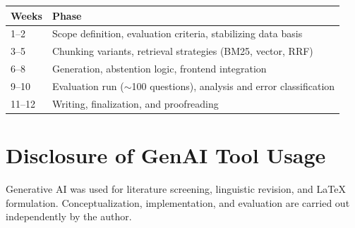 \documentclass[10pt,twocolumn]{article}
\begin{document}
\begin{table}[ht]
\centering
\small
\begin{tabular}{@{}l p{}@{}}
\toprule
\textbf{Weeks} & \textbf{Phase} \\
\midrule
1--2   & Scope definition, evaluation criteria, stabilizing data basis \\
3--5   & Chunking variants, retrieval strategies (BM25, vector, RRF) \\
6--8   & Generation, abstention logic, frontend integration \\
9--10  & Evaluation run ($\sim$100 questions), analysis and error classification \\
11--12 & Writing, finalization, and proofreading \\
\bottomrule
\end{tabular}
\end{table}

\section{Disclosure of GenAI Tool Usage}

Generative AI was used for literature screening, linguistic revision, and \LaTeX{} formulation. Conceptualization, implementation, and evaluation are carried out independently by the author.

\newpage


\end{document}
